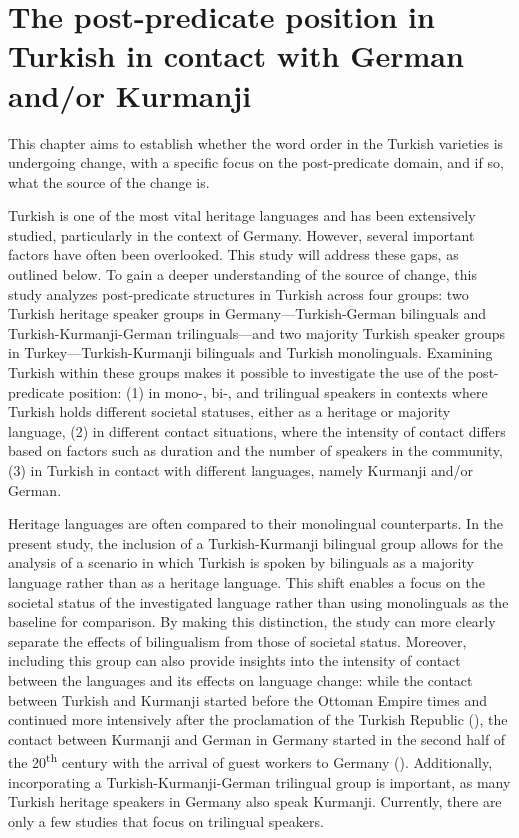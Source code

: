 \chapter[The post-predicate position in Turkish in contact]{The post-predicate position in Turkish in contact with German and/or Kurmanji}\label{chap:key:5}

This chapter aims to establish whether the word order in the Turkish varieties is undergoing change, with a specific focus on the post-predicate domain, and if so, what the source of the change is.

Turkish is one of the most vital heritage languages and has been extensively studied, particularly in the context of Germany. However, several important factors have often been overlooked. This study will address these gaps, as outlined below. To gain a deeper understanding of the source of change, this study analyzes post-predicate structures in Turkish across four groups: two Turkish heritage speaker groups in Germany—Turkish-German bilinguals and Turkish-Kurmanji-German trilinguals—and two majority Turkish speaker groups in Turkey—Turkish-Kurmanji bilinguals and Turkish monolinguals. Examining Turkish within these groups makes it possible to investigate the use of the post-predicate position: (1) in mono-, bi-, and trilingual speakers in contexts where Turkish holds different societal statuses, either as a heritage or majority language, (2) in different contact situations, where the intensity of contact differs based on factors such as duration and the number of speakers in the community, (3) in Turkish in contact with different languages, namely Kurmanji and/or German.

Heritage languages are often compared to their monolingual counterparts. In the present study, the inclusion of a Turkish-Kurmanji bilingual group allows for the analysis of a scenario in which Turkish is spoken by bilinguals as a majority language rather than as a heritage language. This shift enables a focus on the societal status of the investigated language rather than using monolinguals as the baseline for comparison. By making this distinction, the study can more clearly separate the effects of bilingualism from those of societal status. Moreover, including this group can also provide insights into the intensity of contact between the languages and its effects on language change: while the contact between Turkish and Kurmanji started before the Ottoman Empire times and continued more intensively after the proclamation of the Turkish Republic (\citealt{Yagmur2001}), the contact between Kurmanji and German in Germany started in the second half of the 20\textsuperscript{th} century with the arrival of guest workers to Germany (\citealt{GhaderiAlmstadt2023}). Additionally, incorporating a Turkish-Kurmanji-German trilingual group is important, as many Turkish heritage speakers in Germany also speak Kurmanji. Currently, there are only a few studies that focus on trilingual speakers.


